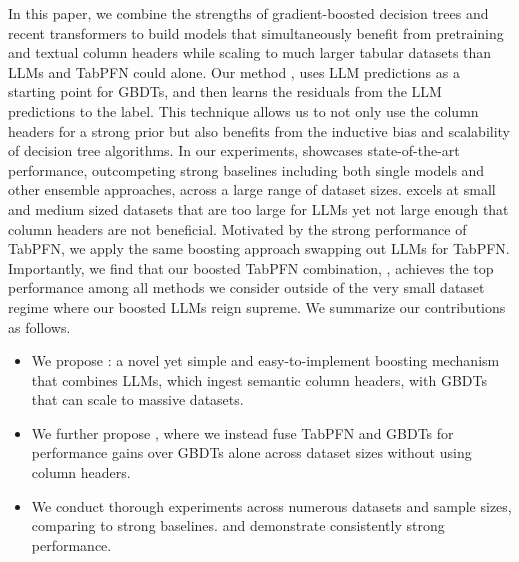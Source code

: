 In this paper, we combine the strengths of gradient-boosted decision trees and recent transformers to build models that simultaneously benefit from pretraining and textual column headers while scaling to much larger tabular datasets than LLMs and TabPFN could alone.  Our method \methodname, uses LLM predictions as a starting point for GBDTs, and then learns the residuals from the LLM predictions to the label.  This technique allows us to not only use the column headers for a strong prior but also benefits from the inductive bias and scalability of decision tree algorithms. In our experiments, \methodname showcases state-of-the-art performance, outcompeting strong baselines including both single models and other ensemble approaches, across a large range of dataset sizes.  \methodname excels at small and medium sized datasets that are too large for LLMs yet not large enough that column headers are not beneficial.  Motivated by the strong performance of TabPFN, we apply the same boosting approach swapping out LLMs for TabPFN. Importantly, we find that our boosted TabPFN combination, \methodnamepfn, achieves the top performance among all methods we consider outside of the very small dataset regime where our boosted LLMs reign supreme.  We summarize our contributions as follows.
\begin{itemize}[topsep=2pt, itemsep=2pt, parsep=0pt, leftmargin=5mm]
\item We propose \methodname: a novel yet simple and easy-to-implement boosting mechanism that combines LLMs, which ingest semantic column headers, with GBDTs that can scale to massive datasets.
\item We further propose \methodnamepfn, where we instead fuse TabPFN and GBDTs for performance gains over GBDTs alone across dataset sizes without using column headers.
\item We conduct thorough experiments across numerous datasets and sample sizes, comparing to strong baselines. \methodname and \methodnamepfn demonstrate consistently strong performance.
\end{itemize}